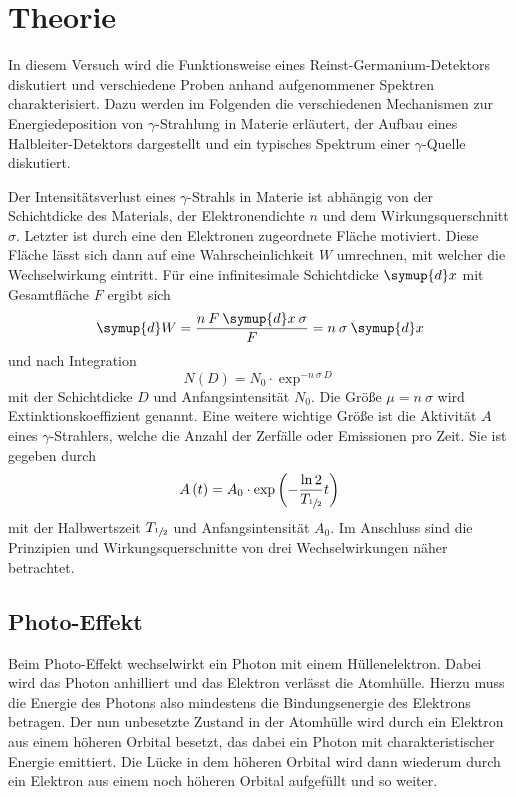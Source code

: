 \section{Theorie}
\label{sec:Theorie}

In diesem Versuch wird die Funktionsweise eines Reinst-Germanium-Detektors diskutiert
und verschiedene Proben anhand aufgenommener Spektren charakterisiert.
Dazu werden im Folgenden die verschiedenen Mechanismen zur Energiedeposition von
$\gamma$-Strahlung in Materie erläutert, der Aufbau eines Halbleiter-Detektors
dargestellt und ein typisches Spektrum einer $\gamma$-Quelle diskutiert.

Der Intensitätsverlust eines $\gamma$-Strahls in Materie ist abhängig von
der Schichtdicke des Materials, der Elektronendichte $n$ und dem
Wirkungsquerschnitt $\sigma$.
Letzter ist durch eine den Elektronen zugeordnete Fläche motiviert.
Diese Fläche lässt sich dann auf eine Wahrscheinlichkeit $W$ umrechnen,
mit welcher die Wechselwirkung eintritt. Für eine infinitesimale Schichtdicke
$\symup{d}x$ mit Gesamtfläche $F$ ergibt sich
\begin{equation*}
	\symup{d}W = \frac{n\:F\:\symup{d}x\:\sigma}{F} = n\:\sigma\:\symup{d}x
\end{equation*}
und nach Integration
\begin{equation}
	N\left(D\right) = N_\text{0} \cdot \exp^{-n\:\sigma\:D}
	\label{eqn:Intensitaet-Exp}
\end{equation}
mit der Schichtdicke $D$ und Anfangsintensität $N_\text{0}$.
Die Größe $\mu = n\:\sigma$ wird Extinktionskoeffizient genannt.
Eine weitere wichtige Größe ist die Aktivität $A$ eines $\gamma$-Strahlers,
welche die Anzahl der Zerfälle oder Emissionen pro Zeit.
Sie ist gegeben durch
\begin{equation}
	A\left(t\right) = A_0 \cdot \exp\left(-\frac{\ln 2}{T_{\sfrac{1}{2}}} t\right)
	\label{eqn:AktivitaetFormel}
\end{equation}
mit der Halbwertszeit $T_{\sfrac{1}{2}}$ und Anfangsintensität $A_0$.
Im Anschluss sind die Prinzipien und Wirkungsquerschnitte von drei
Wechselwirkungen näher betrachtet.

\subsection{Photo-Effekt}
\label{sec:Photo-Effekt}

Beim Photo-Effekt wechselwirkt ein Photon mit einem Hüllenelektron. Dabei
wird das Photon anhilliert und das Elektron verlässt die Atomhülle.
Hierzu muss die Energie des Photons also mindestens die Bindungsenergie des
Elektrons betragen.
Der nun unbesetzte Zustand in der Atomhülle wird durch ein Elektron aus
einem höheren Orbital besetzt, das dabei ein Photon mit charakteristischer
Energie emittiert. Die Lücke in dem höheren Orbital wird dann wiederum durch
ein Elektron aus einem noch höheren Orbital aufgefüllt und so weiter.

